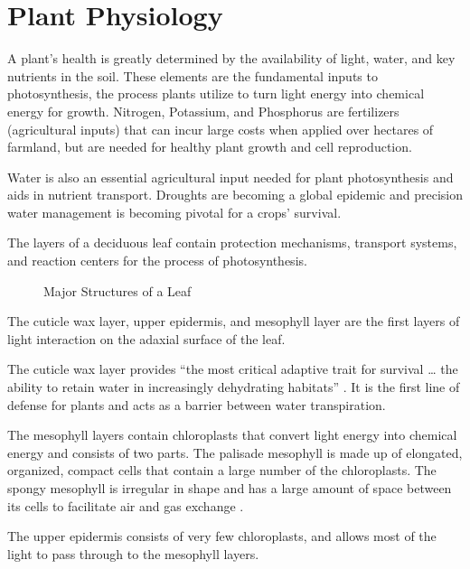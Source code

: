 \section{Plant Physiology}
A plant's health is greatly determined by the availability of light, water, and key nutrients in the soil.  These elements are the fundamental inputs to photosynthesis, the process plants utilize to turn light energy into chemical energy for growth.  Nitrogen, Potassium, and Phosphorus are fertilizers (agricultural inputs) that can incur large costs when applied over hectares of farmland, but are needed for healthy plant growth and cell reproduction.

Water is also an essential agricultural input needed for plant photosynthesis and aids in nutrient transport.  Droughts are becoming a global epidemic and precision water management is becoming pivotal for a crops' survival.

The layers of a deciduous leaf contain protection mechanisms, transport systems, and reaction centers for the process of photosynthesis.
%
\begin{figure}[!htb]
    \begin{center}
    \end{center}
    \caption{Major Structures of a Leaf}
    \label{fig:polarization}
\end{figure}
%
The cuticle wax layer, upper epidermis, and mesophyll layer are the first layers of light interaction on the adaxial surface of the leaf.

The cuticle wax layer provides “the most critical adaptive trait for survival … the ability to retain water in increasingly dehydrating habitats” \cite{cuticle}.  It is the first line of defense for plants and acts as a barrier between water transpiration.

The mesophyll layers contain chloroplasts that convert light energy into chemical energy and consists of two parts. The palisade mesophyll is made up of elongated, organized, compact cells that contain a large number of the chloroplasts.  The spongy mesophyll is irregular in shape and has a large amount of space between its cells to facilitate air and gas exchange \cite{plantexchange}.

The upper epidermis consists of very few chloroplasts, and allows most of the light to pass through to the mesophyll layers.




